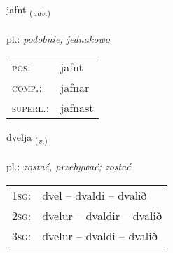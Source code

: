\documentclass[frontgrid, backgrid]{flacards}\usepackage[]{graphicx}\usepackage[]{xcolor}
\begin{document}
\renewcommand{\flhead}{\vskip5pt \fboxsep=0pt {\small\bfseries\footnotesize Atviksorð | Adverb}}
\renewcommand{\fcfoot}{\vskip5pt \fboxsep=0pt \hspace{2pt}{\small\bfseries\footnotesize 2K}}

\renewcommand{\blhead}{\vskip5pt {\small\bfseries\footnotesize Atviksorð | Adverb }}
\renewcommand{\bcfoot}{\vskip5pt \hspace{2pt}{\small\bfseries\footnotesize 2K}}


{jafnt \small{\textsubscript{(\textit{adv.})}} \\[1ex] %
\textphonetic{[jam̥t]} \\
pl.: \emph{podobnie; jednakowo} \\  [2ex]
\renewcommand*{\arraystretch}{0.8}
\begin{tabular}{ll}
\textsc{pos}: & jafnt \\ 
\textsc{comp.}: & jafnar \\ 
\textsc{superl.}: & jafnast \\
\end{tabular}
}

\renewcommand{\flhead}{\vskip5pt \fboxsep=0pt {\small\bfseries\footnotesize Sagnorð | Verb}}
\renewcommand{\fcfoot}{\vskip5pt \fboxsep=0pt \hspace{2pt}{\small\bfseries\footnotesize 2K}}

\renewcommand{\blhead}{\vskip5pt {\small\bfseries\footnotesize Sagnorð | Verb }}
\renewcommand{\bcfoot}{\vskip5pt \hspace{2pt}{\small\bfseries\footnotesize 2K}}


{dvelja \small{\textsubscript{(\textit{v.})}} \\[1ex] %
\textphonetic{[tvɛlja]} \\
pl.: \emph{zostać, przebywać; zostać} \\  [2ex]
\renewcommand*{\arraystretch}{0.8}
\begin{tabular}{p{1cm}l}
\textsc{1sg}: & dvel -- dvaldi -- dvalið \\ 
\textsc{2sg}: & dvelur -- dvaldir -- dvalið \\ 
\textsc{3sg}: & dvelur -- dvaldi -- dvalið \\ 
\end{tabular}
}
\end{document}
